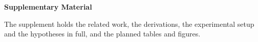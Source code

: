 \clearpage
\appendix
\renewcommand{\thesection}{S\arabic{section}}
\renewcommand{\thefigure}{S\arabic{figure}}
\renewcommand{\thetable}{S\arabic{table}}
\setcounter{section}{0}\setcounter{figure}{0}\setcounter{table}{0}
\begin{center}\Large\bfseries Supplementary Material\end{center}
\medskip
\noindent The supplement holds the related work, the derivations, the experimental setup and the
hypotheses in full, and the planned tables and figures.





